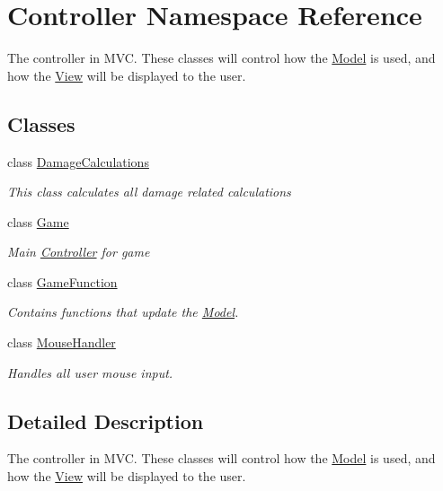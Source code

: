 \hypertarget{namespace_controller}{}\section{Controller Namespace Reference}
\label{namespace_controller}


The controller in M\+VC. These classes will control how the \hyperlink{namespace_model}{Model} is used, and how the \hyperlink{namespace_view}{View} will be displayed to the user.  


\subsection*{Classes}
\begin{DoxyCompactItemize}
\item 
class \hyperlink{class_controller_1_1_damage_calculations}{Damage\+Calculations}
\begin{DoxyCompactList}\small\item\em This class calculates all damage related calculations \end{DoxyCompactList}\item 
class \hyperlink{class_controller_1_1_game}{Game}
\begin{DoxyCompactList}\small\item\em Main \hyperlink{namespace_controller}{Controller} for game \end{DoxyCompactList}\item 
class \hyperlink{class_controller_1_1_game_function}{Game\+Function}
\begin{DoxyCompactList}\small\item\em Contains functions that update the \hyperlink{namespace_model}{Model}. \end{DoxyCompactList}\item 
class \hyperlink{class_controller_1_1_mouse_handler}{Mouse\+Handler}
\begin{DoxyCompactList}\small\item\em Handles all user mouse input. \end{DoxyCompactList}\end{DoxyCompactItemize}


\subsection{Detailed Description}
The controller in M\+VC. These classes will control how the \hyperlink{namespace_model}{Model} is used, and how the \hyperlink{namespace_view}{View} will be displayed to the user. 

